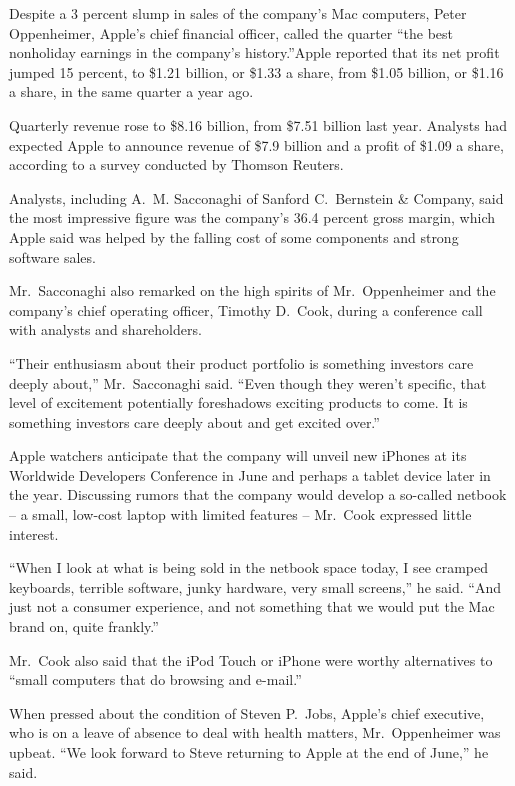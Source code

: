 \documentclass[12pt,a4paper,onecolumn]{article}
\begin{document}
Despite a 3 percent slump in sales of the company's Mac computers, Peter Oppenheimer, Apple's chief
financial officer, called the quarter ``the best nonholiday earnings in the company's
history.''Apple reported that its net profit jumped 15 percent, to \$1.21 billion, or \$1.33 a share,
from \$1.05 billion, or \$1.16 a share, in the same quarter a year ago.

Quarterly revenue rose to \$8.16 billion, from \$7.51 billion last year. Analysts had expected Apple
to announce revenue of \$7.9 billion and a profit of \$1.09 a share, according to a survey conducted
by Thomson Reuters.

Analysts, including A.~M. Sacconaghi of Sanford C.~Bernstein \& Company, said the most impressive
figure was the company's 36.4 percent gross margin, which Apple said was helped by the falling cost
of some components and strong software sales.

Mr.~Sacconaghi also remarked on the high spirits of Mr.~Oppenheimer and the company's chief
operating officer, Timothy D.~Cook, during a conference call with analysts and shareholders.

``Their enthusiasm about their product portfolio is something investors care deeply about,''
Mr.~Sacconaghi said. ``Even though they weren't specific, that level of excitement potentially
foreshadows exciting products to come. It is something investors care deeply about and get excited
over.''

Apple watchers anticipate that the company will unveil new iPhones at its Worldwide Developers
Conference in June and perhaps a tablet device later in the year. Discussing rumors that the company
would develop a so-called netbook -- a small, low-cost laptop with limited features -- Mr.~Cook
expressed little interest.

``When I look at what is being sold in the netbook space today, I see cramped keyboards, terrible
software, junky hardware, very small screens,'' he said. ``And just not a consumer experience, and
not something that we would put the Mac brand on, quite frankly.''

Mr.~Cook also said that the iPod Touch or iPhone were worthy alternatives to ``small computers that
do browsing and e-mail.''

When pressed about the condition of Steven P.~Jobs, Apple's chief executive, who is on a leave of
absence to deal with health matters, Mr.~Oppenheimer was upbeat. ``We look forward to Steve
returning to Apple at the end of June,'' he said.
\end{document}
